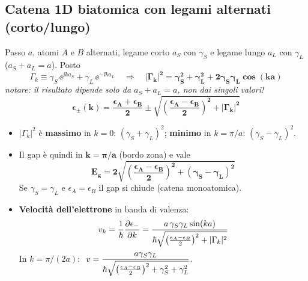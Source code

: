\subsection{Catena 1D biatomica con legami alternati (corto/lungo)}
\label{sec:alternati}
Passo $a$, atomi $A$ e $B$ alternati, legame corto $a_S$ con $\gamma_S$ e legame lungo $a_L$ con $\gamma_L$ ($a_S+a_L=a$). Posto
\[ \Gamma_k \equiv \gamma_S\,\ee^{\ii k a_S} + \gamma_L\,\ee^{-\ii k a_L}
   \quad\Longrightarrow\quad
   \bm{|\Gamma_k|^2 = \gamma_S^2+\gamma_L^2+2\gamma_S\gamma_L\cos(ka)} \]
\textit{notare: il risultato dipende solo da $a_S+a_L=a$, non dai singoli valori!}
\[ \bm{\epsilon_\pm(k) = \frac{\epsilon_A+\epsilon_B}{2}\pm\sqrt{\left(\frac{\epsilon_A-\epsilon_B}{2}\right)^2+|\Gamma_k|^2}} \]
\begin{itemize}
  \item $|\Gamma_k|^2$ è \textbf{massimo} in $k=0$: $(\gamma_S+\gamma_L)^2$; \textbf{minimo} in $k=\pi/a$: $(\gamma_S-\gamma_L)^2$.
  \item Il gap è quindi in $\bm{k=\pi/a}$ (bordo zona) e vale
  \[ \bm{E_g = 2\sqrt{\left(\frac{\epsilon_A-\epsilon_B}{2}\right)^2 + (\gamma_S-\gamma_L)^2}} \]
  Se $\gamma_S=\gamma_L$ e $\epsilon_A=\epsilon_B$ il gap si chiude (catena monoatomica).
  \item \textbf{Velocità dell'elettrone} in banda di valenza:
  \[ v_k = \frac{1}{\hbar}\frac{\partial\epsilon_-}{\partial k}
        = \frac{a\,\gamma_S\gamma_L\sin(ka)}{\hbar\sqrt{\left(\frac{\epsilon_A-\epsilon_B}{2}\right)^2+|\Gamma_k|^2}} \]
  In $k=\pi/(2a)$: $\ \displaystyle v = \frac{a\gamma_S\gamma_L}{\hbar\sqrt{\left(\frac{\epsilon_A-\epsilon_B}{2}\right)^2+\gamma_S^2+\gamma_L^2}}$.
\end{itemize}

